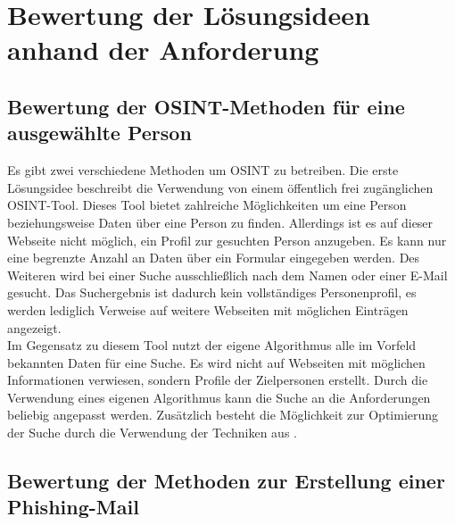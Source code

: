 

\chapter{Bewertung der Lösungsideen anhand der Anforderung}  %
\label{cha:BewertungLösungsideenAnhandAnforderung} %

\section{Bewertung der OSINT-Methoden für eine ausgewählte Person}
Es gibt zwei verschiedene Methoden um OSINT zu betreiben. Die erste Lösungsidee beschreibt die Verwendung von einem öffentlich frei zugänglichen OSINT-Tool. Dieses Tool bietet zahlreiche Möglichkeiten um eine Person beziehungsweise Daten über eine Person zu finden. Allerdings ist es auf dieser Webseite nicht möglich, ein Profil zur gesuchten Person anzugeben. Es kann nur eine begrenzte Anzahl an Daten über ein Formular eingegeben werden. Des Weiteren wird bei einer Suche ausschließlich nach dem Namen oder einer E-Mail gesucht. Das Suchergebnis ist dadurch kein vollständiges Personenprofil, es werden lediglich Verweise auf weitere Webseiten mit möglichen Einträgen angezeigt.\\
Im Gegensatz zu diesem Tool nutzt der eigene Algorithmus alle im Vorfeld bekannten Daten für eine Suche. Es wird nicht auf Webseiten mit möglichen Informationen verwiesen, sondern Profile der Zielpersonen erstellt. Durch die Verwendung eines eigenen Algorithmus kann die Suche an die Anforderungen beliebig angepasst werden. Zusätzlich besteht die Möglichkeit zur Optimierung der Suche durch die Verwendung der Techniken aus \cite{Bazzell}.
\section{Bewertung der Methoden zur Erstellung einer Phishing-Mail}

